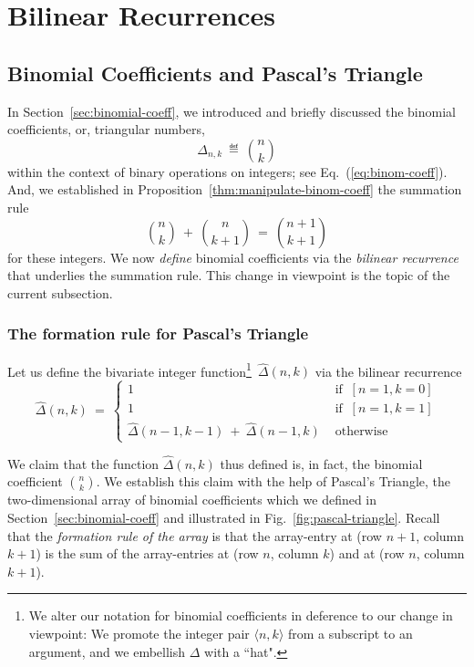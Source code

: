 \section{Bilinear Recurrences}
\label{sec:bilinear-recurrences}

\subsection{Binomial Coefficients and Pascal's Triangle}
\label{sec:binomial-coeff+Pascal}

 
In Section~\ref{sec:binomial-coeff}, we introduced and briefly discussed the binomial coefficients, or, triangular numbers, 
\[ \Delta_{n,k} \ \eqdef \ {n \choose k} \]
within the context of binary operations on integers; see Eq.~(\ref{eq:binom-coeff}).  And, we established in Proposition~\ref{thm:manipulate-binom-coeff} the summation rule
\[
{n \choose k} \ + \ {n \choose {k+1}} \ = \ {{n+1} \choose {k+1}}
\]
for these integers.  We now {\em define} binomial coefficients via the {\em bilinear recurrence} that underlies the summation rule.  This change in viewpoint is the topic of the current subsection.

\subsubsection{The formation rule for Pascal's Triangle}
\label{sec:Pascal-formation}

Let us define the bivariate integer function\footnote{We alter our notation for binomial coefficients in deference to our change in viewpoint: We promote the integer pair $\langle n,k \rangle$ from a subscript to an argument, and we embellish $\Delta$ with a ``hat".}~$\hat{\Delta}(n,k)$ via the bilinear recurrence
\begin{equation}
\label{eq:binom-coeff-recurrence}
\hat{\Delta}(n,k) \ = \ 
\left\{
\begin{array}{cl}
1  & \mbox{ if } \ [n=1, k=0] \\
1  & \mbox{ if } \ [n=1, k=1] \\
\hat{\Delta}(n-1, k-1) \ + \  \hat{\Delta}(n-1,k) & \mbox{ otherwise}
\end{array}
\right.
\end{equation}

\smallskip

We claim that the function $\hat{\Delta}(n,k)$ thus defined is, in fact, the binomial coefficient $\displaystyle {n \choose k}$.  We establish this claim with the help of Pascal's Triangle, the two-dimensional array of binomial coefficients which we defined in Section~\ref{sec:binomial-coeff} and illustrated in Fig.~\ref{fig:pascal-triangle}.  Recall that the {\em formation rule of the array} is that the array-entry at (row $n+1$, column $k+1$) is the sum of the array-entries at (row $n$, column $k$) and at (row $n$, column $k+1$).

